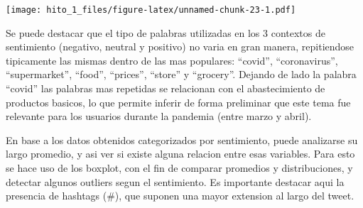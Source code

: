 \documentclass[
]{article}
\newenvironment{Shaded}{\begin{snugshade}}{\end{snugshade}}
\newcommand{\CommentTok}[1]{\textcolor[rgb]{0.56,0.35,0.01}{\textit{#1}}}
\newcommand{\DataTypeTok}[1]{\textcolor[rgb]{0.13,0.29,0.53}{#1}}
\newcommand{\DecValTok}[1]{\textcolor[rgb]{0.00,0.00,0.81}{#1}}
\newcommand{\FloatTok}[1]{\textcolor[rgb]{0.00,0.00,0.81}{#1}}
\newcommand{\KeywordTok}[1]{\textcolor[rgb]{0.13,0.29,0.53}{\textbf{#1}}}
\newcommand{\NormalTok}[1]{#1}
\newcommand{\OperatorTok}[1]{\textcolor[rgb]{0.81,0.36,0.00}{\textbf{#1}}}
\newcommand{\OtherTok}[1]{\textcolor[rgb]{0.56,0.35,0.01}{#1}}
\newcommand{\StringTok}[1]{\textcolor[rgb]{0.31,0.60,0.02}{#1}}
\begin{document}
\begin{Shaded}
\end{Shaded}

\texttt{[image: hito\_1\_files/figure-latex/unnamed-chunk-23-1.pdf]}

Se puede destacar que el tipo de palabras utilizadas en los 3 contextos
de sentimiento (negativo, neutral y positivo) no varia en gran manera,
repitiendose tipicamente las mismas dentro de las mas populares:
``covid'', ``coronavirus'', ``supermarket'', ``food'', ``prices'',
``store'' y ``grocery''. Dejando de lado la palabra ``covid'' las
palabras mas repetidas se relacionan con el abastecimiento de productos
basicos, lo que permite inferir de forma preliminar que este tema fue
relevante para los usuarios durante la pandemia (entre marzo y abril).

En base a los datos obtenidos categorizados por sentimiento, puede
analizarse su largo promedio, y asi ver si existe alguna relacion entre
esas variables. Para esto se hace uso de los boxplot, con el fin de
comparar promedios y distribuciones, y detectar algunos outliers segun
el sentimiento. Es importante destacar aqui la presencia de hashtags
(\#), que suponen una mayor extension al largo del tweet.
\end{document}
